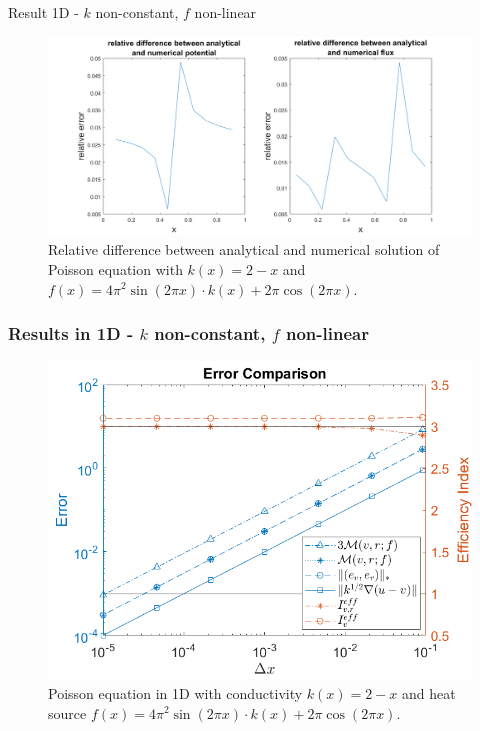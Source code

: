 \documentclass[t]{beamer}
\begin{document}
\begin{frame}{Result 1D - $k$ non-constant, $f$ non-linear}
\begin{figure}
\vspace{-5pt}
\centering
\includegraphics[width = 1.0\linewidth, left]{difference_analytical_numerical.png}
\caption{Relative difference between analytical and numerical solution of Poisson equation with $k(x) = 2-x$ and $f(x) = 4\pi^2\sin(2\pi x)\cdot k(x) + 2\pi\cos(2\pi x)$.}
\label{fig:fig:diff}
\end{figure}
\end{frame}

\begin{frame}
\frametitle{Results in 1D - $k$ non-constant, $f$ non-linear}
\vspace{-18pt}
\begin{figure}[t]
\centering
\includegraphics[width = 0.7\linewidth]{convergenceplot_k_f_non_constant.png}
\caption{Poisson equation in 1D with conductivity $k(x) = 2-x$ and heat source $f(x) = 4\pi^2\sin(2\pi x)\cdot k(x) + 2\pi\cos(2\pi x)$.}
\label{fig:Convergence1d}
\end{figure}

\end{frame}
\end{document}
